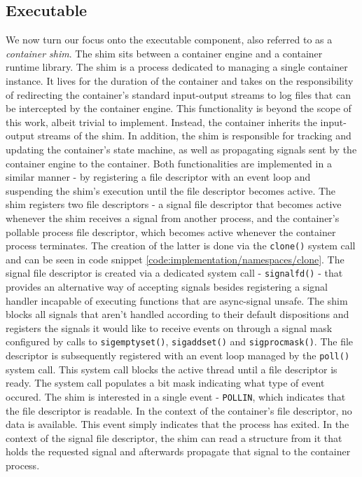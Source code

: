 \subsection{Executable}
\label{ch:implementation/runtime/executable}
We now turn our focus onto the executable component, also referred to as a \textit{container shim}.
The shim sits between a container engine and a container runtime library. The shim is a process 
dedicated to managing a single container instance. It lives for the duration of the container
and takes on the responsibility of redirecting the container's standard input-output streams 
to log files that can be intercepted by the container engine. This functionality is beyond the scope of this work,
albeit trivial to implement. Instead, the container inherits the input-output streams of the shim. 
In addition, the shim is responsible for tracking 
and updating the container's state machine, as well as propagating signals sent by the container engine to the container. 
Both functionalities are implemented in a similar manner - 
by registering a file descriptor with an event loop and suspending the shim's execution until 
the file descriptor becomes active. The shim registers two file descriptors - a signal file 
descriptor that becomes active whenever the shim receives a signal from another process, and the 
container's pollable process file descriptor, which becomes active whenever the container process 
terminates. The creation of the latter is done via the \verb|clone()| system call and can be seen in code snippet \ref{code:implementation/namespaces/clone}.
The signal file descriptor is created via a dedicated system call - \verb|signalfd()| - 
that provides an alternative way of accepting signals besides registering a signal handler 
incapable of executing functions that are async-signal unsafe. The shim blocks all signals 
that aren't handled according to their default dispositions and registers the signals it would 
like to receive events on through a signal mask configured by calls to \verb|sigemptyset()|, 
\verb|sigaddset()| and \verb|sigprocmask()|. The file descriptor is subsequently registered 
with an event loop managed by the \verb|poll()| system call. This system call blocks 
the active thread until a file descriptor is ready. The system call populates a bit mask 
indicating what type of event occured. The shim is interested in a single event - \verb|POLLIN|,
which indicates that the file descriptor is readable. In the context of the container's file descriptor,
no data is available. This event simply indicates that the process has exited. In the context of the 
signal file descriptor, the shim can read a structure from it that holds the requested signal and 
afterwards propagate that signal to the container process.

